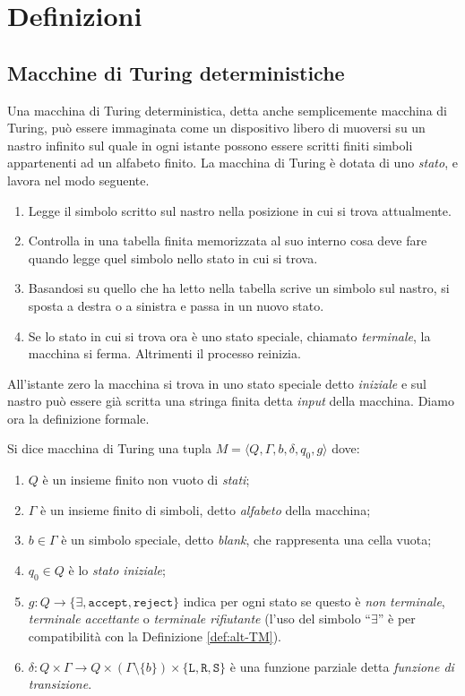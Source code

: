 \chapter{Definizioni}


\section{Macchine di Turing deterministiche}
\label{sec:det-TM}
Una macchina di Turing deterministica, detta anche semplicemente macchina di
Turing, può essere immaginata come un dispositivo libero di
muoversi su un nastro infinito sul quale in ogni istante possono essere scritti
finiti simboli appartenenti ad un alfabeto finito. La macchina di Turing è
dotata di uno \emph{stato}, e lavora nel modo seguente.
\begin{enumerate}
 \item Legge il simbolo scritto sul nastro nella posizione in cui si trova attualmente.
 \item Controlla in una tabella finita memorizzata al suo interno cosa deve fare
 quando legge quel simbolo nello stato in cui si trova.
 \item Basandosi su quello che ha letto nella tabella scrive un simbolo sul nastro,
 si sposta a destra o a sinistra e passa in un nuovo stato.
 \item Se lo stato in cui si trova ora è uno stato speciale, chiamato \emph{terminale},
 la macchina si ferma. Altrimenti il processo reinizia.
\end{enumerate}
All'istante zero la macchina si trova in uno stato speciale detto \emph{iniziale}
e sul nastro può essere già scritta una stringa finita detta \emph{input} della macchina.
Diamo ora la definizione formale.
\begin{definizione}
Si dice macchina di Turing una tupla
$M=\langle Q, \Gamma, b, \delta, q_0, g\rangle$ dove:
\begin{enumerate}
 \item $Q$ è un insieme finito non vuoto di \emph{stati};
 \item $\Gamma$ è un insieme finito di simboli, detto \emph{alfabeto} della macchina;
 \item $b \in \Gamma$ è un simbolo speciale, detto \emph{blank}, che rappresenta
 una cella vuota;
 \item $q_0 \in Q$ è lo \emph{stato iniziale};
 \item $g: Q \to \{\exists, \texttt{accept}, \texttt{reject}\}$
  indica per ogni stato se questo è \emph{non terminale}, \emph{terminale accettante} o
  \emph{terminale rifiutante} (l'uso del simbolo ``$\exists$'' è per compatibilità
  con la Definizione \ref{def:alt-TM}).
 \item $\delta: Q \times \Gamma \to Q \times (\Gamma \setminus \{b\}) \times \{\texttt{L},\texttt{R},\texttt{S}\}$
 è una funzione parziale detta \emph{funzione di transizione}.
\end{enumerate}
\end{definizione}

